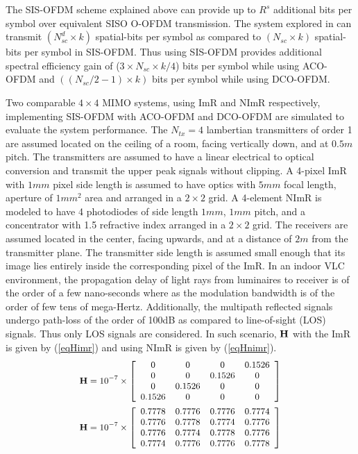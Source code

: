 \documentclass[12pt,letterpaper,onecolumn]{article} %
\newcommand{\vm}[1]{{\bf{#1}}}
\begin{document}
The SIS-OFDM scheme explained above can provide up to $R^s$ additional bits per symbol over equivalent SISO O-OFDM transmission. The system explored in \cite{zha12a} can transmit $(N_{sc}^d\times k)$ spatial-bits per symbol as compared to $(N_{sc}\times k)$ spatial-bits per symbol in SIS-OFDM. Thus using SIS-OFDM provides additional spectral efficiency gain of ($3\times N_{sc}\times k/4$) bits per symbol while using ACO-OFDM and $((N_{sc}/2 -1)\times k)$ bits per symbol while using DCO-OFDM.

Two comparable $4\times 4$ MIMO systems, using ImR and NImR respectively, implementing SIS-OFDM with ACO-OFDM and DCO-OFDM are simulated to evaluate the system performance. The $N_{tx}=4$ lambertian transmitters of order 1 are assumed located on the ceiling of a room, facing vertically down, and at $0.5m$ pitch. The transmitters are assumed to have a linear electrical to optical conversion and transmit the upper peak signals without clipping. A 4-pixel ImR with $1mm$ pixel side length is assumed to have optics with $5mm$ focal length, aperture of $1mm^2$ area and arranged in a $2\times 2$ grid. A 4-element NImR is modeled to have 4 photodiodes of side length $1mm$, $1mm$ pitch, and a concentrator with 1.5 refractive index arranged in a $2\times 2$ grid. The receivers are assumed located in the center, facing upwards, and at a distance of $2m$ from the transmitter plane. The transmitter side length is assumed small enough that its image lies entirely inside the corresponding pixel of the ImR. In an indoor VLC environment, the propagation delay of light rays from luminaires to receiver is of the order of a few nano-seconds where as the modulation bandwidth is of the order of few tens of mega-Hertz. Additionally, the multipath reflected signals undergo path-loss of the order of 100dB as compared to line-of-sight (LOS) signals. Thus only LOS signals are considered. In such scenario, $\vm{H}$ with the ImR is given by (\ref{eqHimr}) and using NImR is given by (\ref{eqHnimr}).
\begin{subequations}
\small
\begin{align}
	\vm{H} = 10^{-7}\times\left[
	                      \begin{array}{cccc}
												0&0&0&0.1526\\
												0&0&0.1526&0\\
												0&0.1526&0&0\\
												0.1526&0&0&0
												\end{array}
												\right]\label{eqHimr}\\
	\vm{H} = 10^{-7}\times\left[
	                      \begin{array}{cccc}
												0.7778&0.7776&0.7776&0.7774\\
												0.7776&0.7778&0.7774&0.7776\\
												0.7776&0.7774&0.7778&0.7776\\
												0.7774&0.7776&0.7776&0.7778
												\end{array}
												\right]\label{eqHnimr}
\end{align}
\label{eqH}
\end{subequations}
\end{document}
